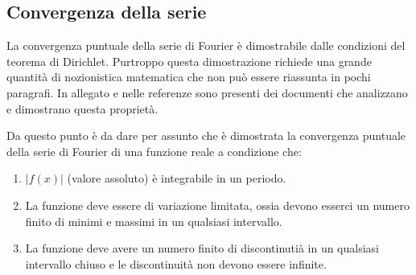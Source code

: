 \subsection{Convergenza della serie}
La convergenza puntuale della serie di Fourier \`e dimostrabile dalle
condizioni del teorema di Dirichlet. Purtroppo questa dimostrazione richiede
una grande quantit\`a di nozionistica matematica che non pu\`o essere riassunta
in pochi paragrafi.  In allegato e nelle referenze sono presenti dei documenti
che analizzano e dimostrano questa propriet\`a.


Da questo punto \`e da dare per assunto che \`e dimostrata la convergenza
puntuale della serie di Fourier di una funzione reale a condizione che:
\begin{enumerate}
	\item \(|f(x)|\) (valore assoluto) \`e integrabile in un periodo.
	\item La funzione deve essere di variazione limitata, ossia devono esserci
		un numero finito di minimi e massimi in un qualsiasi intervallo.
	\item La funzione deve avere un numero finito di discontinuti\`a in un
		qualsiasi intervallo chiuso e le discontinuit\`a non devono essere infinite.
\end{enumerate}


